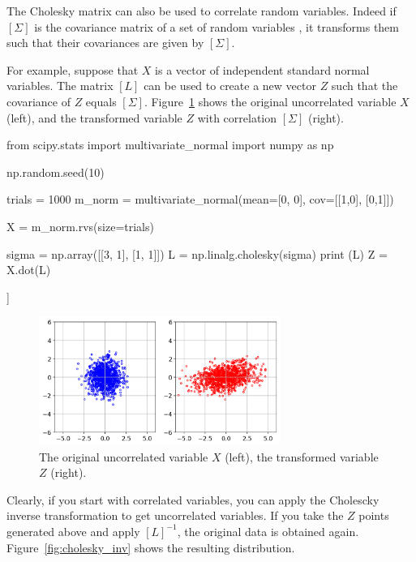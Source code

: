 The Cholesky matrix can also be used to correlate random variables. Indeed if $[\Sigma]$ is the covariance matrix of a set of random variables , it transforms them such that their covariances are given by $[\Sigma]$. 

For example, suppose that $X$ is a vector of independent standard normal variables. The matrix $[L]$ can be used to create a new vector $Z$ such that the covariance of $Z$ equals $[\Sigma]$.
Figure~\ref{fig:cholesky_norm} shows the original uncorrelated variable $X$ (left), and the transformed variable $Z$ with correlation $[\Sigma]$ (right).

\begin{ipython}
from scipy.stats import multivariate_normal
import numpy as np

np.random.seed(10)

trials = 1000
m_norm = multivariate_normal(mean=[0, 0], cov=[[1,0],
                                               [0,1]])

X = m_norm.rvs(size=trials)

sigma = np.array([[3, 1], [1, 1]])
L = np.linalg.cholesky(sigma)
print (L)
Z = X.dot(L)
\end{ipython}
\begin{ioutput}
[[1.73205081 0.        ]
 [0.57735027 0.81649658]]
\end{ioutput}

\begin{figure}[htbp]
\centering
\includegraphics[width=0.7\textwidth]{figures/cholesky_norm}
\caption{The original uncorrelated variable $X$ (left), the transformed variable $Z$ (right).}
\label{fig:cholesky_norm}
\end{figure}

Clearly, if you start with correlated variables, you can apply the Cholescky inverse transformation to get uncorrelated variables.
If you take the $Z$ points generated above and apply $[L]^{-1}$, the original data is obtained again. Figure~\ref{fig:cholesky_inv} shows the resulting distribution.

